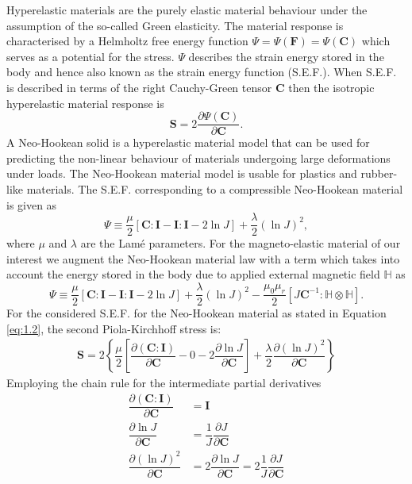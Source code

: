 \documentclass[11pt,a4paper,final]{article}
\begin{document}
Hyperelastic materials are the purely elastic material behaviour under the assumption of the so-called Green elasticity. The material response is characterised by a Helmholtz free energy function $\Psi = \Psi(\mathbf{F}) = \Psi(\mathbf{C}) $ which serves as a potential for the stress. $\Psi$ describes the strain energy stored in the body and hence also known as the strain energy function (S.E.F.). When S.E.F. is described in terms of the right Cauchy-Green tensor $\mathbf{C}$ then the isotropic hyperelastic material response is 
\begin{equation}
\mathbf{S} = 2 \dfrac{\partial \Psi (\mathbf{C})}{\partial \mathbf{C}}.
\end{equation}
A Neo-Hookean solid is a hyperelastic material model that can be used for predicting the non-linear behaviour of materials undergoing large deformations under loads. The Neo-Hookean material model is usable for plastics and rubber-like materials. The S.E.F. corresponding to a compressible Neo-Hookean material is given as
\begin{equation}
\Psi \equiv \dfrac{\mu}{2} [\mathbf{C} : \mathbf{I} - \mathbf{I} : \mathbf{I} - 2 \ln J] + \dfrac{\lambda}{2} (\ln J)^2,
\label{eq:1.2}
\end{equation}
where $\mu$ and $\lambda$ are the Lam\'e parameters. For the magneto-elastic material of our interest we augment the Neo-Hookean material law with a term which takes into account the energy stored in the body due to applied external magnetic field $\mathbb{H}$ as 
\begin{equation}
\Psi \equiv \dfrac{\mu}{2} [\mathbf{C} : \mathbf{I} - \mathbf{I} : \mathbf{I} - 2 \ln J] + \dfrac{\lambda}{2} (\ln J)^2 - \frac{\mu_0 \mu_r}{2} [J \mathbf{C}^{-1} : \mathbb{H} \otimes \mathbb{H}].
\label{eq:1.2.2}
\end{equation}
For the considered S.E.F. for the Neo-Hookean material as stated in Equation \eqref{eq:1.2}, the second Piola-Kirchhoff stress is:
\begin{align}
\mathbf{S} = 2 \left\{ \dfrac{\mu}{2} \left[\dfrac{\partial (\mathbf{C} : \mathbf{I})}{\partial \mathbf{C}} - 0 - 2 \dfrac{\partial \ln J}{\partial \mathbf{C}}\right] + \dfrac{\lambda}{2} \dfrac{\partial (\ln J)^2}{\partial \mathbf{C}} \right\}
\end{align}
Employing the chain rule for the intermediate partial derivatives
\begin{align}
\dfrac{\partial (\mathbf{C} : \mathbf{I})}{\partial \mathbf{C}} &= \mathbf{I} \label{eq:1.4.1} \\ 
\dfrac{\partial \ln J}{\partial \mathbf{C}} &= \dfrac{1}{J} \dfrac{\partial J}{\partial \mathbf{C}} \label{eq:1.4.2} \\ 
\dfrac{\partial (\ln J)^2}{\partial \mathbf{C}} &= 2 \dfrac{\partial \ln J}{\partial \mathbf{C}} = 2 \dfrac{1}{J} \dfrac{\partial J}{\partial \mathbf{C}}
\label{eq:1.4.3}
\end{align}
\end{document}
